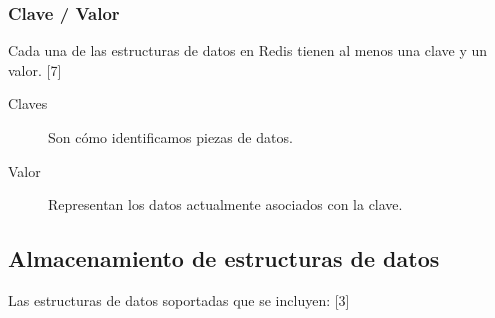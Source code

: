 \documentclass[twocolumn]{article}
\begin{document}
\subsubsection{Clave / Valor}

Cada una de las estructuras de datos en Redis tienen al menos una clave y un valor. [7]

\begin{description}
  \item[Claves] Son cómo identificamos piezas de datos.
  \item[Valor] Representan los datos actualmente asociados con la clave.
\end{description}

\subsection{Almacenamiento de estructuras de datos}

Las estructuras de datos soportadas que se incluyen: [3]
\end{document}
